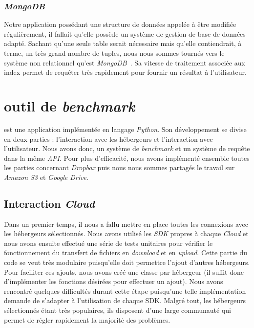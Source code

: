 \documentclass[10pt]{article}
\begin{document}
\subsubsection{\textit{MongoDB}}

Notre application possédant une structure de données appelée à être modifiée
régulièrement, il fallait qu'elle possède un système de gestion de base de
données adapté. Sachant qu'une seule table serait nécessaire mais qu'elle
contiendrait, à terme, un très grand nombre de tuples, nous nous sommes tournés
vers le système non relationnel qu'est \textit{MongoDB}~\cite{MongoDB}. Sa vitesse de
traitement associée aux index permet de requêter très rapidement pour fournir
un résultat à l'utilisateur.

\section{\KYD outil de \textit{benchmark} }

\KYD est une application implémentée en langage \textit{Python}. Son
développement se divise en deux parties : l'interaction avec les hébergeurs et
l'interaction avec l'utilisateur. Nous avons donc, un système de
\textit{benchmark} et un système de requête dans la même \textit{API}. Pour plus
d'efficacité, nous avons implémenté ensemble toutes les parties concernant
\textit{Dropbox} puis nous nous sommes partagés le travail sur \textit{Amazon
S3} et \textit{Google Drive}.

\subsection{Interaction \textit{Cloud}}

Dans un premier temps, il nous a fallu mettre en place toutes les connexions
avec les hébergeurs sélectionnés. Nous avons utilisé les \textit{SDK} propres à
chaque \textit{Cloud} et nous avons ensuite effectué une série de tests
unitaires pour vérifier le fonctionnement du transfert de fichiers en
\textit{download} et en \textit{upload}. Cette partie du code se veut très modulaire puisqu'elle doit permettre l'ajout
d'autres hébergeurs. Pour faciliter ces ajouts, nous avons créé une classe par
hébergeur (il suffit donc d'implémenter les fonctions désirées pour effectuer un
ajout). Nous avons rencontré quelques difficultés durant cette étape puisqu'une
telle implémentation demande de s'adapter à l'utilisation de chaque SDK. Malgré
tout, les hébergeurs sélectionnés étant très populaires, ils disposent d'une
large communauté qui permet de régler rapidement la majorité des problèmes.
\end{document}
